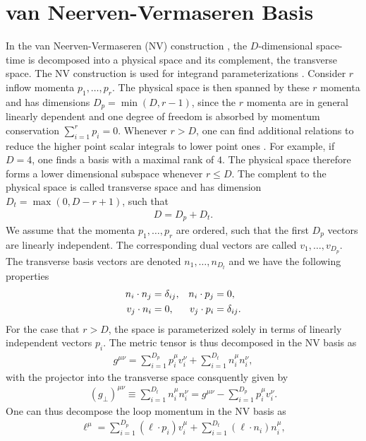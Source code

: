 \chapter{van Neerven-Vermaseren Basis}
In the van Neerven-Vermaseren (NV) construction
\cite{Neerven1984a}, the $D$-dimensional
space-time is decomposed into a physical space and its complement, the
transverse space. The NV construction is used for integrand
parameterizations \cite{Ellis:2007br,Ita:2011hi}. Consider $r$ inflow momenta $p_1,\dots,p_r$. The
physical space is then spanned by these $r$ momenta and has dimensions
$D_p=\min(D,r-1)$, since the $r$ momenta are in general linearly dependent and one degree of freedom is absorbed by momentum
conservation $\sum_{i=1}^rp_i = 0$. Whenever $r>D$, one can find
additional relations to reduce the higher point scalar integrals to
lower point ones \cite{Melrose1965}. For example, if $D=4$, one finds
a basis with a maximal rank of $4$. The physical space therefore forms
a lower dimensional subspace whenever $r\leq D$. The complent to the
physical space is called
transverse space and has dimension $D_t=\max(0,D-r+1)$, such that
\begin{align}
  D=D_p+D_t.
\end{align}
We assume that the momenta $p_1,\dots,p_r$ are ordered, such that the
first $D_p$ vectors are linearly independent. The corresponding dual
vectors are called $v_{1},\dots,v_{D_p}$. The transverse basis
vectors are denoted $n_{1},\dots,n_{D_t}$ and we have the following properties
\begin{align}
    n_i\cdot n_j &= \delta_{ij}, & n_i\cdot p_j &= 0,\\
   v_j \cdot n_i  &= 0, & v_j\cdot p_i &= \delta_{ij}.\notag
\end{align}
For the case that $r > D$, the space
is parameterized solely in terms of linearly independent vectors
$p_i$. 
 The metric tensor is thus decomposed in the NV basis as 
\begin{align}
  g^{\mu\nu} = \sum_{i=1}^{D_p}p_i^\mu v_i^\nu+\sum_{i=1}^{D_t}n_i^\mu n_i^\nu,
\end{align}
with the projector into the transverse space consquently given by
\begin{align}\label{eq:metricpron}
  (g_\perp)^{\mu\nu} \equiv  \sum_{i=1}^{D_t}n_i^\mu n_i^\nu = g^{\mu\nu}- \sum_{i=1}^{D_p}p_i^\mu v_i^\nu.
\end{align}
One can thus decompose the loop momentum in the NV basis as 
\begin{align}
  \ell^\mu = \sum_{i=1}^{D_p}(\ell\cdot p_i)
  v_i^\mu+\sum_{i=1}^{D_t}(\ell\cdot n_i) n_i^\mu,
\end{align}
